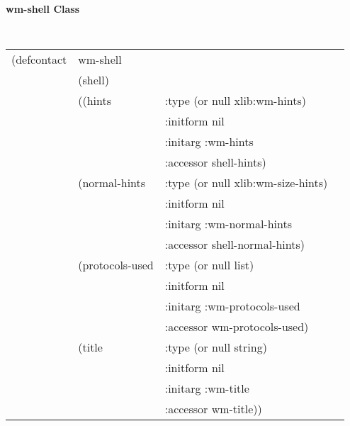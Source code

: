 \documentclass[twoside]{book}
\begin{document}
\begin{sloppy}
{\samepage 
{\large {\bf wm-shell \hfill Class}} 
\begin{flushright} \parbox[t]{6.125in}{
\tt
\begin{tabular}{llll}
\raggedright
(defcontact &wm-shell \\
& (shell) \\
& ((hints&                :type     (or null xlib:wm-hints) \\
&			& :initform nil  \\
&			& :initarg  :wm-hints \\
&			& :accessor shell-hints)    \\
&   (normal-hints &        :type     (or null xlib:wm-size-hints) \\
&			& :initform nil  \\
&			& :initarg  :wm-normal-hints \\
&			& :accessor shell-normal-hints) \\
&   (protocols-used &           :type     (or null list)  \\
&			& :initform nil  \\
&			& :initarg  :wm-protocols-used \\
&			& :accessor wm-protocols-used) \\
&   (title   &             :type     (or null string) \\
&			& :initform nil  \\
&			& :initarg  :wm-title \\
&			& :accessor wm-title))\\
\end{tabular}
\rm
}\end{flushright}}


\end{sloppy}
\end{document}

